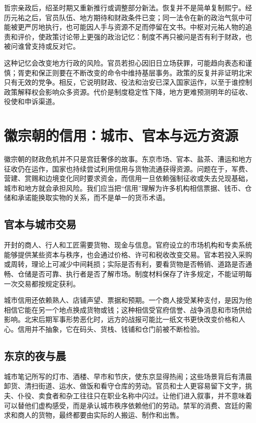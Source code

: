 哲宗亲政后，绍圣时期又重新推行或调整部分新法。恢复并不是简单复制熙宁。经历元祐之后，官员队伍、地方期待和财政条件已变；同一法令在新的政治气氛中可能被更严厉地执行，也可能因人手与资源不足而停留在文书。中枢对元祐人物的追责和评价，使政策讨论带上更强的政治记忆：制度不再只被问是否有利于财政，也被问谁曾支持或反对它。

这种记忆会改变地方行政的风险。官员若担心因旧日立场获罪，可能趋向表态和谨慎；胥吏和保正则要在不断改变的命令中维持基层事务。政策的反复并非证明北宋只有无效的党争。相反，它说明财政、役法和治安已深入国家运作，以至于谁控制政策解释权会影响众多资源。代价是制度稳定性下降，地方更难预测明年的征收、役使和申诉渠道。

\section{徽宗朝的信用：城市、官本与远方资源}

徽宗朝的财政危机并不只是宫廷奢侈的故事。东京市场、官本、盐茶、漕运和地方征收仍在运作，国家也持续尝试利用信用与货物流通获得资源。问题在于，军费、营建、赏赐和边境变化同时要求资金，而信用一旦依赖强制征收或失去兑现基础，城市和地方就会承担风险。我们应当把“信用”理解为许多机构相信票据、钱币、仓储和承诺能换取实物的关系，而不是单一的货币术语。

\subsection{官本与城市交易}

开封的商人、行人和工匠需要货物、现金与信息。官府设立的市场机构和专卖系统能够提供某些资本与秩序，也会通过价格、许可和税收改变交易。官本若投入采购或周转，理论上可减少中间耗损；实际是否有利，要看货物是否畅销、道路是否通畅、仓储是否可靠、执行者是否了解市场。制度材料保存了许多规定，不能证明每一次交易都按规定获利。

城市信用还依赖熟人、店铺声望、票据和预期。一个商人接受某种支付，是因为他相信它能在另一个地点换成货物或钱；这种相信受官府信誉、战争消息和市场供给影响。北宋后期军事形势恶化时，远方的战报可能比一纸文书更快改变价格和人心。信用并不抽象，它在码头、货栈、钱铺和仓门前被不断检验。

\subsection{东京的夜与晨}

城市笔记所写的灯市、酒楼、早市和节庆，使东京显得热闹；这些场景背后有清晨卸货、清扫街道、运水、做饭和看守仓库的劳动。官员和士人更容易留下文字，挑夫、仆役、卖食者和杂工往往只在职业名称中闪过。让他们进入叙事，并不意味着可以替他们虚构感受，而是承认城市秩序依赖他们的劳动。禁军的消费、宫廷的需求和商人的货物，最终都要由实际的人搬运、制作和出售。

